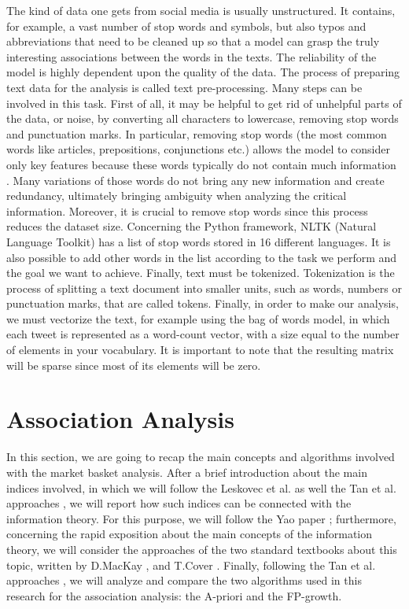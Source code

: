 \documentclass[12pt,%
               a4paper,%
               oneside,openany,%
               titlepage,%
               headinclude,footinclude,%
               BCOR5mm,%
               cleardoublepage=empty,%
               tablecaptionabove,%
               floatperchapter,
               ]{scrreprt}                 %
\begin{document}
The kind of data one gets from social media is usually unstructured. It contains, for example, a vast number of stop words and symbols, but also typos and abbreviations that need to be cleaned up so that a model can grasp the truly interesting associations between the words in the texts. The reliability of the model is highly dependent upon the quality of the data. The process of preparing text data for the analysis is called text pre-processing. Many steps can be involved in this task.
First of all, it may be helpful to get rid of unhelpful parts of the data, or noise, by converting all characters to lowercase, removing stop words and punctuation marks. In particular, removing stop words (the most common words like articles, prepositions, conjunctions etc.) allows the model to consider only key features because these words typically do not contain much information \cite{etaiwi2017impact}. Many variations of those words do not bring any new information and create redundancy, ultimately bringing ambiguity when analyzing the critical information. Moreover, it is crucial to remove stop words since this process reduces the dataset size. Concerning the Python framework, NLTK (Natural Language Toolkit) \cite{bird2009natural}  has a list of stop words stored in 16 different languages. It is also possible to add other words in the list according to the task we perform and the goal we want to achieve.
Finally, text must be tokenized. Tokenization is the process of splitting a text document into smaller units, such as words, numbers or punctuation marks, that are called tokens.  Finally, in order to make our analysis, we must vectorize the text, for example using the bag of words model, in which each tweet is represented as a word-count vector, with a size equal to the number of elements in your vocabulary. It is important to note that the resulting matrix will be sparse since most of its elements will be zero.



\section{Association Analysis}
In this section, we are going to recap the main concepts and algorithms involved with the market basket analysis. After a brief introduction about the main indices involved, in which we will follow the Leskovec et al. \cite{leskovec2020mining} as well the Tan et al. approaches \cite{tan2019introduction}, we will report how such indices can be connected with the information theory. For this purpose, we will follow the Yao paper \cite{yao2003information}; furthermore, concerning the rapid exposition about the main concepts of the information theory, we will consider the approaches of the two standard textbooks about this topic, written by D.MacKay \cite{mackay2003information}, and T.Cover \cite{cover2006elements}. Finally, following the Tan et al. approaches \cite{tan2019introduction}, we will analyze and compare the two algorithms used in this research for the association analysis: the A-priori and the FP-growth.
\end{document}
